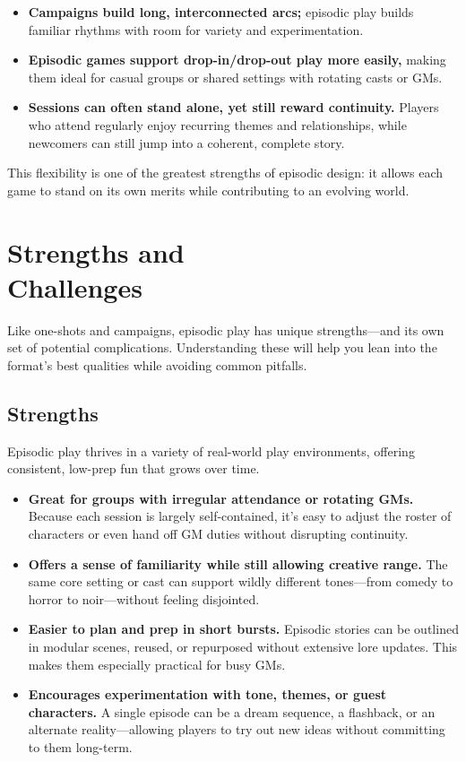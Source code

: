 \begin{itemize}\raggedright
    \item \textbf{Campaigns build long, interconnected arcs;} episodic play builds familiar rhythms with room for variety and experimentation.
    
    \item \textbf{Episodic games support drop-in/drop-out play more easily,} making them ideal for casual groups or shared settings with rotating casts or GMs.

    \item \textbf{Sessions can often stand alone, yet still reward continuity.} Players who attend regularly enjoy recurring themes and relationships, while newcomers can still jump into a coherent, complete story.
\end{itemize}

This flexibility is one of the greatest strengths of episodic design: it allows each game to stand on its own merits while contributing to an evolving world.

\section[Strengths and Challenges]{Strengths and\\ Challenges}

Like one-shots and campaigns, episodic play has unique strengths—and its own set of potential complications. Understanding these will help you lean into the format’s best qualities while avoiding common pitfalls.

\subsection*{Strengths}

Episodic play thrives in a variety of real-world play environments, offering consistent, low-prep fun that grows over time.

\begin{itemize}
    \item \textbf{Great for groups with irregular attendance or rotating GMs.} Because each session is largely self-contained, it's easy to adjust the roster of characters or even hand off GM duties without disrupting continuity.

    \item \textbf{Offers a sense of familiarity while still allowing creative range.} The same core setting or cast can support wildly different tones—from comedy to horror to noir—without feeling disjointed.

    \item \textbf{Easier to plan and prep in short bursts.} Episodic stories can be outlined in modular scenes, reused, or repurposed without extensive lore updates. This makes them especially practical for busy GMs.

    \item \textbf{Encourages experimentation with tone, themes, or guest characters.} A single episode can be a dream sequence, a flashback, or an alternate reality—allowing players to try out new ideas without committing to them long-term.
\end{itemize}

